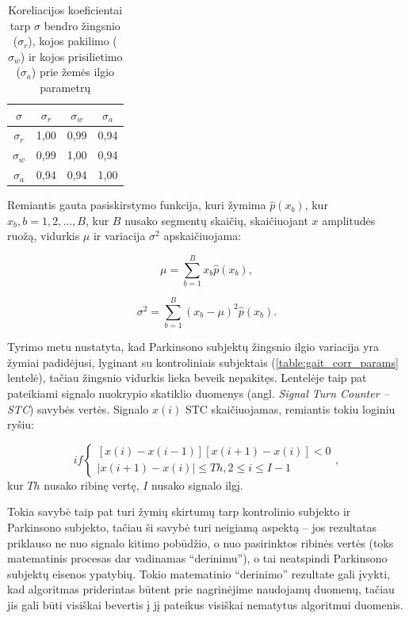 \documentclass[]{vgtuef}
\begin{document}
\begin{table}[b]
  \renewcommand{\arraystretch}{1.3}
  \centering
  \caption{Koreliacijos koeficientai tarp $\sigma$ bendro žingsnio ($\sigma_r$), kojos pakilimo ($\sigma_w$) ir kojos prisilietimo ($\sigma_a$) prie žemės ilgio parametrų \cite{5280353}}
  \label{table:stance_swing_string_corr}
  \begin{tabular}{|c|c|c|c|} \hline
    $\sigma$ & $\sigma_r$ & $\sigma_w$ & $\sigma_a$ \\ \hline
    $\sigma_r$ & 1,00 & 0,99 & 0,94 \\ \hline
    $\sigma_w$ & 0,99 & 1,00 & 0,94 \\ \hline
    $\sigma_a$ & 0,94 & 0,94 & 1,00 \\ \hline
  \end{tabular}
\end{table}

Remiantis gauta pasiskirstymo funkcija, kuri žymima  $\hat{p}(x_b)$, kur $x_b, b = 1, 2, ..., B$, kur $B$ nusako segmentų skaičių, skaičiuojant $x$ amplitudės ruožą, vidurkis $\mu$ ir variacija $\sigma^2$ apskaičiuojama:

\begin{equation}
\mu = \sum_{b=1}^{B} x_b \hat{p}(x_b),
\end{equation}

\begin{equation}
\sigma^2 = \sum_{b=1}^{B} (x_b - \mu)^2 \hat{p}(x_b).
\end{equation}

Tyrimo metu nustatyta, kad Parkinsono subjektų žingsnio ilgio variacija yra žymiai padidėjusi, lyginant su kontroliniais subjektais (\ref{table:gait_corr_params} lentelė), tačiau žingsnio vidurkis lieka beveik nepakitęs. Lentelėje taip pat pateikiami signalo nuokrypio skatiklio duomenys (angl. \textit{Signal Turn Counter --STC}) savybės vertės. Signalo $x(i)$ STC skaičiuojamas, remiantis tokiu loginiu ryšiu:

\begin{equation}
 if \left\{ \begin{array}{l}
 	[x(i)-x(i-1)][x(i+1)-x(i)] < 0 \\
 	|x(i+1)-x(i)| \leq Th, 2 \leq i \leq I-1
 \end{array} \right. ,
\end{equation}
kur $Th$ nusako ribinę vertę, $I$ nusako signalo ilgį.

Tokia savybė taip pat turi žymių skirtumų tarp kontrolinio subjekto ir Parkinsono subjekto, tačiau ši savybė turi neigiamą aspektą -- jos rezultatas priklauso ne nuo signalo kitimo pobūdžio, o nuo pasirinktos ribinės vertės (toks matematinis procesas dar vadinamas ``derinimu''), o tai neatspindi Parkinsono subjektų eisenos ypatybių. Tokio matematinio ``derinimo'' rezultate gali įvykti, kad algoritmas priderintas būtent prie nagrinėjime naudojamų duomenų, tačiau jis gali būti visiškai bevertis į jį pateikus visiškai nematytus algoritmui duomenis.
\end{document}
